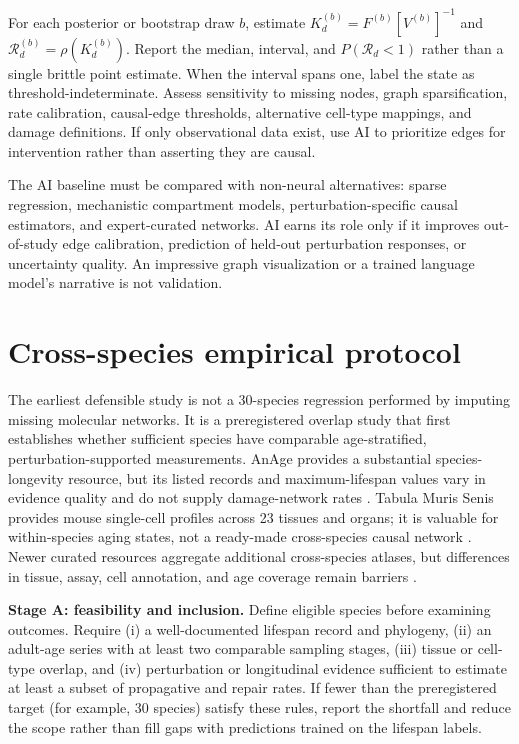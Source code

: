 \documentclass[11pt,a4paper]{article}
\newcommand{\Rd}{\mathcal{R}_{d}}
\newcommand{\rhoop}{\rho}
\begin{document}
For each posterior or bootstrap draw $b$, estimate $K_d^{(b)}=F^{(b)}[V^{(b)}]^{-1}$ and $\Rd^{(b)}=\rhoop(K_d^{(b)})$. Report the median, interval, and $P(\Rd<1)$ rather than a single brittle point estimate. When the interval spans one, label the state as threshold-indeterminate. Assess sensitivity to missing nodes, graph sparsification, rate calibration, causal-edge thresholds, alternative cell-type mappings, and damage definitions. If only observational data exist, use AI to prioritize edges for intervention rather than asserting they are causal.

The AI baseline must be compared with non-neural alternatives: sparse regression, mechanistic compartment models, perturbation-specific causal estimators, and expert-curated networks. AI earns its role only if it improves out-of-study edge calibration, prediction of held-out perturbation responses, or uncertainty quality. An impressive graph visualization or a trained language model's narrative is not validation.

\section{Cross-species empirical protocol}
The earliest defensible study is not a 30-species regression performed by imputing missing molecular networks. It is a preregistered overlap study that first establishes whether sufficient species have comparable age-stratified, perturbation-supported measurements. AnAge provides a substantial species-longevity resource, but its listed records and maximum-lifespan values vary in evidence quality and do not supply damage-network rates \citep{anage}. Tabula Muris Senis provides mouse single-cell profiles across 23 tissues and organs; it is valuable for within-species aging states, not a ready-made cross-species causal network \citep{tabulamuris2020}. Newer curated resources aggregate additional cross-species atlases, but differences in tissue, assay, cell annotation, and age coverage remain barriers \citep{agingatlas2020,speedatlas}.

\textbf{Stage A: feasibility and inclusion.} Define eligible species before examining outcomes. Require (i) a well-documented lifespan record and phylogeny, (ii) an adult-age series with at least two comparable sampling stages, (iii) tissue or cell-type overlap, and (iv) perturbation or longitudinal evidence sufficient to estimate at least a subset of propagative and repair rates. If fewer than the preregistered target (for example, 30 species) satisfy these rules, report the shortfall and reduce the scope rather than fill gaps with predictions trained on the lifespan labels.
\end{document}
